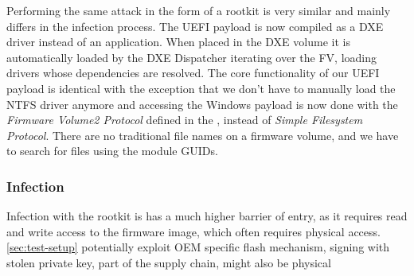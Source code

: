 Performing the same attack in the form of a rootkit is very similar and mainly differs in the infection process.
The \ac{UEFI} payload is now compiled as a \ac{DXE} driver instead of an application.
When placed in the \ac{DXE} volume it is automatically loaded by the \ac{DXE} Dispatcher iterating over the \ac{FV}, loading  drivers whose dependencies are resolved.
The core functionality of our \ac{UEFI} payload is identical with the exception that we don't have to manually load the \ac{NTFS} driver anymore and accessing the Windows payload is now done with the \emph{Firmware Volume2 Protocol} defined in the \cite[3.4.1]{pi-spec}, instead of \emph{Simple Filesystem Protocol}. There are no traditional file names on a firmware volume, and we have to search for files using the module \acp{GUID}.

\subsubsection{Infection}

Infection with the rootkit is has a much higher barrier of entry, as it requires read and write access to the firmware image, which often requires physical access.
\autoref{sec:test-setup} potentially exploit \ac{OEM} specific flash mechanism, signing with stolen private key, part of the supply chain, might also be physical 

